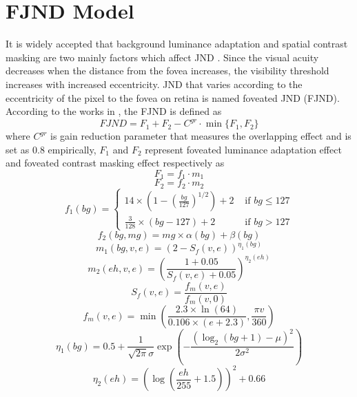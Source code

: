 \documentclass[journal]{IEEEtran}
\begin{document}
\section{FJND Model}
It is widely accepted that background luminance adaptation and spatial contrast masking are two mainly factors which affect JND \cite{RN634, RN639}. Since the visual acuity decreases when the distance from the fovea increases, the visibility threshold increases with increased eccentricity. JND that varies according to the eccentricity of the pixel to the fovea on retina is named foveated JND (FJND). According to the works in \cite{RN635, RN633}, the FJND is defined as
\begin{equation}
FJND=F_1+F_2-C^{gr}\cdot \min \{F_1, F_2 \}
\label{eq1}
\end{equation}
where $C^{gr}$ is gain reduction parameter that measures the overlapping effect and is set as 0.8 empirically, $F_1$ and $F_2$ represent foveated luminance adaptation effect and foveated contrast masking effect respectively as
\begin{equation}
F_1=f_1\cdot m_1
\label{eq2}
\end{equation}
\begin{equation}
F_2=f_2\cdot m_2
\label{eq3}
\end{equation}
\begin{equation}
f_1\left(bg\right)=\begin{cases}
{14\times \left ( 1-\left (\frac{bg}{127}  \right)^{1/2}  \right )+2} & {\text{ if } bg\leq 127}\\ 
\frac{3}{128}\times \left(bg - 127\right)+2 & \text{ if } {bg> 127} 
\end{cases}
\end{equation}
\begin{equation}
f_2\left ( bg,mg \right )=mg\times \alpha \left ( bg \right )+\beta \left ( bg \right )
\end{equation}
\begin{equation}
m_1\left ( bg,v,e \right )=\left ( 2-S_f\left ( v,e \right ) \right ) ^{\eta_1 \left ( bg \right )}
\end{equation}
\begin{equation}
m_2\left ( eh,v,e \right )=\left ( \frac{1+0.05}{S_f\left ( v,e \right )+0.05} \right ) ^{\eta_2 \left ( eh \right )}
\end{equation}
\begin{equation}
S_f\left ( v,e \right )=\frac{f_m\left ( v,e \right )}{f_m\left ( v,0 \right )}
\end{equation}
\begin{equation}
f_m\left ( v,e \right )=\min \left ( \frac{2.3\times \ln \left ( 64 \right )}{0.106\times \left ( e+2.3 \right )},\frac{\pi v}{360} \right )
\end{equation}
\begin{equation}
\eta_1 \left ( bg \right )=0.5+\frac{1}{\sqrt{2\pi }\sigma }\exp \left ( -\frac{\left ( \log_{2}\left ( bg+1 \right ) -\mu \right )^2}{2\sigma ^2} \right )
\end{equation}
\begin{equation}
\eta_2 \left ( eh \right )=\left (  \log \left ( \frac{eh}{255}+1.5 \right )\right )^2+0.66
\end{equation}
\end{document}
